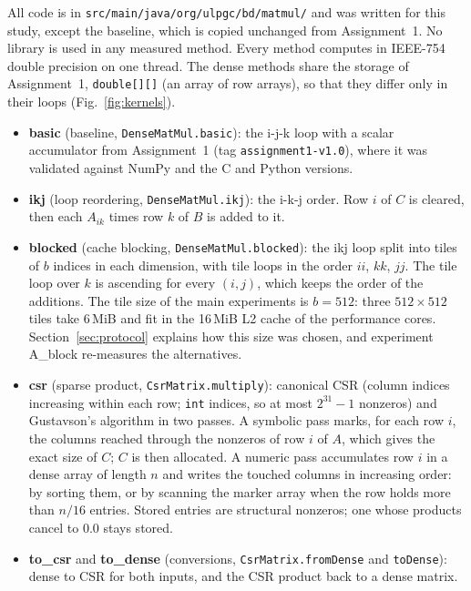 \documentclass[11pt,a4paper]{article}
\begin{document}
All code is in \texttt{src/main/java/org/ulpgc/bd/matmul/} and was written for
this study, except the baseline, which is copied unchanged from
Assignment~1. No library is used in any measured method. Every method computes
in IEEE-754 double precision on one thread. The dense methods share the storage
of Assignment~1, \texttt{double[][]} (an array of row arrays), so that they
differ only in their loops (Fig.~\ref{fig:kernels}).
\begin{itemize}
  \item \textbf{basic} (baseline, \texttt{DenseMatMul.basic}): the i-j-k loop with
  a scalar accumulator from Assignment~1 (tag \texttt{assignment1-v1.0}), where it
  was validated against NumPy and the C and Python versions.
  \item \textbf{ikj} (loop reordering, \texttt{DenseMatMul.ikj}): the i-k-j order.
  Row $i$ of $C$ is cleared, then each $A_{ik}$ times row $k$ of $B$ is added to it.
  \item \textbf{blocked} (cache blocking, \texttt{DenseMatMul.blocked}): the ikj
  loop split into tiles of $b$ indices in each dimension, with tile loops in the
  order $ii$, $kk$, $jj$. The tile loop over $k$ is ascending for every $(i,j)$,
  which keeps the order of the additions. The tile size of the main experiments
  is $b=512$: three $512\times512$ tiles take 6\,MiB and fit in the 16\,MiB L2
  cache of the performance cores. Section~\ref{sec:protocol} explains how this
  size was chosen, and experiment A\_block re-measures the alternatives.
  \item \textbf{csr} (sparse product, \texttt{CsrMatrix.multiply}): canonical CSR
  (column indices increasing within each row; \texttt{int} indices, so at most
  $2^{31}-1$ nonzeros) and Gustavson's algorithm in two passes. A symbolic pass
  marks, for each row $i$, the columns reached through the nonzeros of row $i$ of
  $A$, which gives the exact size of $C$; $C$ is then allocated. A numeric pass
  accumulates row $i$ in a dense array of length $n$ and writes the touched
  columns in increasing order: by sorting them, or by scanning the marker array
  when the row holds more than $n/16$ entries. Stored entries are structural
  nonzeros; one whose products cancel to $0.0$ stays stored.
  \item \textbf{to\_csr} and \textbf{to\_dense} (conversions,
  \texttt{CsrMatrix.fromDense} and \texttt{toDense}): dense to CSR for both
  inputs, and the CSR product back to a dense matrix.
\end{itemize}
\end{document}
